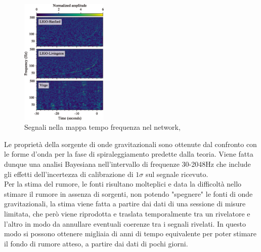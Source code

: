 \begin{figure}
	\vspace{-10pt}
	\begin{center}
		\includegraphics[width=0.37\textwidth]{figures/Capitolo_1/gw170817_time_freq.png}
	\end{center}
	\vspace{-7pt}
	\caption{Segnali nella mappa tempo frequenza nel network, \cite{Abbott_2017a}}
	\label{fig:osservazione_gw170817}
	\vspace{-15pt}
\end{figure}
Le proprietà della sorgente di onde gravitazionali sono ottenute dal confronto con le forme d'onda per la fase di spiraleggiamento predette dalla teoria. Viene fatta dunque una analisi Bayesiana nell'intervallo di frequenze 30-2048Hz che include gli effetti dell'incertezza di calibrazione di $1\sigma$ sul segnale ricevuto.\\Per la stima del rumore, le fonti risultano molteplici e data la difficoltà nello stimare il rumore in assenza di sorgenti, non potendo "spegnere" le fonti di onde gravitazionali, la stima viene fatta a partire dai dati di una sessione di misure limitata, che però viene riprodotta e traslata temporalmente tra un rivelatore e l'altro in modo da annullare eventuali coerenze tra i segnali rivelati. In questo modo si possono ottenere migliaia di anni di tempo equivalente per poter stimare il fondo di rumore atteso, a partire dai dati di pochi giorni.

